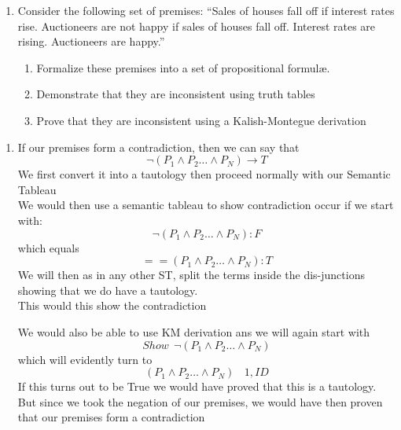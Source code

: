 \documentclass[10.5pt]{article}
\newenvironment{solution}[2][Solution]{ \begin{trivlist}
\item[\hskip \labelsep {\bfseries #1}]}{\end{trivlist}}
\newenvironment{problem}[2][Problem]{\begin{trivlist}
\item[\hskip \labelsep {\bfseries #1}\hskip \labelsep {\bfseries #2.}]}{\end{trivlist}}
\begin{document}
\begin{problem}{5}
\begin{enumerate}
\item Consider the following set of premises: ``Sales of houses fall off if interest rates rise. Auctioneers are not happy if sales of houses fall off. Interest rates are rising. Auctioneers are happy.''
  \begin{enumerate}
  \item Formalize these premises into a set of propositional formul{\ae}.
  \item Demonstrate that they are inconsistent using truth tables
  \item Prove that they are inconsistent using a Kalish-Montegue derivation
  \end{enumerate}
\end{enumerate}
\end{problem}
\begin{solution}{5}
\item[]
\begin{enumerate}
    \item If our premises form a contradiction, then we can say that
$$\neg(P_1 \wedge P_2 \ldots \wedge P_N ) → T$$
We first convert it into a tautology then proceed normally with our Semantic Tableau\\
We would then use a semantic tableau to show contradiction occur if we start with:
$$\neg(P_1 \wedge P_2 \ldots \wedge P_N ) : F$$
which equals
$$ == (P_1 \wedge P_2 \ldots \wedge P_N ) : T$$
We will then as in any other ST, split the terms inside the dis-junctions showing that we do have a tautology. \\ This would this show the contradiction

We would also be able to use KM derivation ans we will again start with $$Show\ \ \neg(P_1 \wedge P_2 \ldots \wedge P_N )$$
which will evidently turn to
$$(P_1 \wedge P_2 \ldots \wedge P_N)\ \ \ \ 1,ID$$
If this turns out to be True we would have proved that this is a tautology.
But since we took the negation of our premises, we would have then proven that our premises form a contradiction


\end{enumerate}
\end{solution}
\end{document}

